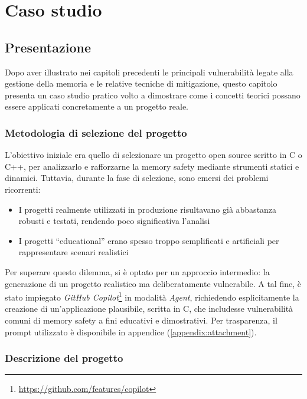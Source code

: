 \chapter{Caso studio}
\label{chap:real_case}

\section{Presentazione}
\label{sec:presentation}

Dopo aver illustrato nei capitoli precedenti le principali vulnerabilità legate alla
gestione della memoria e le relative tecniche di mitigazione, questo capitolo
presenta un caso studio pratico volto a dimostrare come i concetti teorici
possano essere applicati concretamente a un progetto reale.

\subsection*{Metodologia di selezione del progetto}

L'obiettivo iniziale era quello di selezionare un progetto open source scritto in
C o C++, per analizzarlo e rafforzarne la memory safety mediante strumenti
statici e dinamici. Tuttavia, durante la fase di selezione, sono emersi dei problemi
ricorrenti:
\begin{itemize}
  \item I progetti realmente utilizzati in produzione risultavano già abbastanza
    robusti e testati, rendendo poco significativa l'analisi

  \item I progetti ``educational'' erano spesso troppo semplificati e artificiali
    per rappresentare scenari realistici
\end{itemize}

Per superare questo dilemma, si è optato per un approccio intermedio: la generazione
di un progetto realistico ma deliberatamente vulnerabile. A tal fine, è stato impiegato
\textit{GitHub Copilot}\footnote{\url{https://github.com/features/copilot}} in modalità
\textit{Agent}, richiedendo esplicitamente la creazione di un'applicazione plausibile,
scritta in C, che includesse vulnerabilità comuni di memory safety a fini educativi
e dimostrativi. Per trasparenza, il prompt utilizzato è disponibile in appendice
(\autoref{appendix:attachment}).

\subsection*{Descrizione del progetto}

